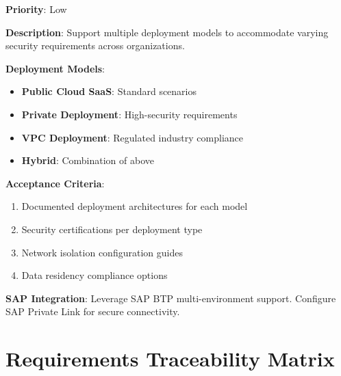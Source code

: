 \documentclass[12pt,a4paper,twoside]{report}
\begin{document}
\begin{tcolorbox}[colback=purple!5,colframe=purple!70,title=BR-5.4: Deployment Flexibility]
\textbf{Priority}: Low

\textbf{Description}: Support multiple deployment models to accommodate varying
security requirements across organizations.

\textbf{Deployment Models}:
\begin{itemize}
\item \textbf{Public Cloud SaaS}: Standard scenarios
\item \textbf{Private Deployment}: High-security requirements
\item \textbf{VPC Deployment}: Regulated industry compliance
\item \textbf{Hybrid}: Combination of above
\end{itemize}

\textbf{Acceptance Criteria}:
\begin{enumerate}
\item Documented deployment architectures for each model
\item Security certifications per deployment type
\item Network isolation configuration guides
\item Data residency compliance options
\end{enumerate}

\textbf{SAP Integration}: Leverage SAP BTP multi-environment support. Configure
SAP Private Link for secure connectivity.
\end{tcolorbox}


\section{Requirements Traceability Matrix}
\end{document}
